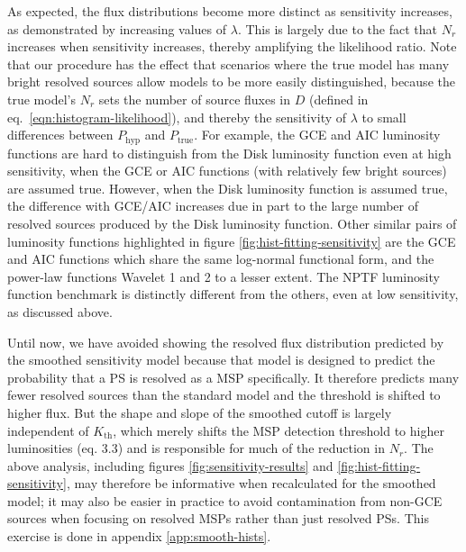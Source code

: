 \documentclass[letter,11pt]{article}
\begin{document}
As expected, the flux distributions become more distinct as sensitivity increases, as demonstrated by increasing values of $\lambda$. This is largely due to the fact that $N_r$ increases when sensitivity increases, thereby amplifying the likelihood ratio. Note that our procedure has the effect that scenarios where the true model has many bright resolved sources allow models to be more easily distinguished, because the true model's $N_r$ sets the number of source fluxes in $D$ (defined in eq.~\ref{eqn:histogram-likelihood}), and thereby the sensitivity of $\lambda$ to small differences between $P_\text{hyp}$ and $P_\text{true}$.
For example, the GCE and AIC luminosity functions are hard to distinguish from the Disk luminosity function even at high sensitivity, when the GCE or AIC functions (with relatively few bright sources) are assumed true. However, when the Disk luminosity function is assumed true, the difference with GCE/AIC increases due in part to the large number of resolved sources produced by the Disk luminosity function. Other similar pairs of luminosity functions highlighted in figure \ref{fig:hist-fitting-sensitivity} are the GCE and AIC functions which share the same log-normal functional form, and the power-law functions Wavelet 1 and 2 to a lesser extent. The NPTF luminosity function benchmark is distinctly different from the others, even at low sensitivity, as discussed above.

Until now, we have avoided showing the resolved flux distribution predicted by the smoothed sensitivity model because that model is designed to predict the probability that a PS is resolved as a MSP specifically. It therefore predicts many fewer resolved sources than the standard model and the threshold is shifted to higher flux. But the shape and slope of the smoothed cutoff is largely independent of $K_\text{th}$, which merely shifts the MSP detection threshold to higher luminosities (eq. 3.3) and is responsible for much of the reduction in $N_r$. The above analysis, including figures \ref{fig:sensitivity-results} and \ref{fig:hist-fitting-sensitivity}, may therefore be informative when recalculated for the smoothed model; it may also be easier in practice to avoid contamination from non-GCE sources when focusing on resolved MSPs rather than just resolved PSs. This exercise is done in appendix \ref{app:smooth-hists}.




\end{document}
